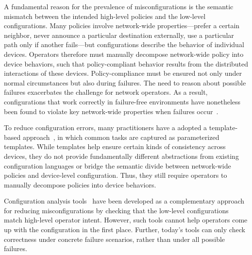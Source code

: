 \documentclass[10pt]{sigalternate052015}
\begin{document}

A fundamental reason for the prevalence of misconfigurations is the
semantic mismatch between the intended high-level
policies and the low-level configurations.
Many policies involve network-wide properties---prefer a certain neighbor,
never announce a particular destination externally,
use a particular path only if another fails---but configurations describe the behavior of
individual devices.
%
Operators therefore must manually decompose network-wide policy into
device behaviors, such that policy-compliant behavior results from the distributed interactions of
these devices.
%
Policy-compliance must be ensured not only under normal
circumstances but also during failures.  The need to reason
about possible failures exacerbates the challenge
for network operators.  As a result, configurations that work
correctly in failure-free environments have nonetheless been found to violate key
network-wide properties when failures occur~\cite{batfish}.

To reduce configuration errors, many practitioners have a adopted a template-based
approach~\cite{hatch,thwack}, in which common tasks are captured as parameterized templates.
%
%
While templates help ensure certain kinds of consistency across devices,
they do not provide fundamentally different abstractions from existing configuration languages
or bridge the semantic divide between network-wide policies and device-level configuration.
Thus, they still require operators to
manually decompose policies into device behaviors.

Configuration analysis tools~\cite{batfish,feamster+:rcc} have been developed as a complementary approach for reducing misconfigurations by checking that the low-level configurations match high-level operator intent. However, such tools cannot help operators come up with the configuration in the first place. Further, today's tools can only check correctness under concrete failure scenarios, rather than under all possible failures.
\end{document}
